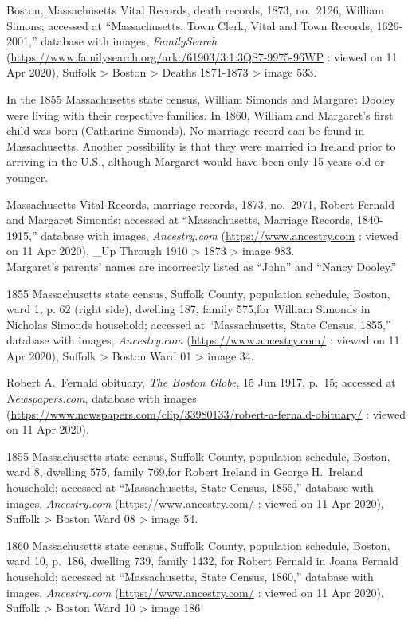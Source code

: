 \begin{thebibliography}{99}
	Boston, Massachusetts Vital Records, death records, 1873, no.\ 2126, William Simons; accessed at ``Massachusetts, Town Clerk, Vital and Town Records, 1626-2001,'' database with images, \textit{FamilySearch} (\url{https://www.familysearch.org/ark:/61903/3:1:3QS7-9975-96WP} : viewed on 11 Apr 2020), Suffolk > Boston > Deaths 1871-1873 > image 533.
	
	In the 1855 Massachusetts state census, William Simonds and Margaret Dooley were living with their respective families. In 1860, William and Margaret's first child was born (Catharine Simonds). No marriage record can be found in Massachusetts. Another possibility is that they were married in Ireland prior to arriving in the U.S., although Margaret would have been only 15 years old or younger.
	
	Massachusetts Vital Records, marriage records, 1873, no.\ 2971, Robert Fernald and Margaret Simonds; accessed at ``Massachusetts, Marriage Records, 1840-1915,'' database with images, \textit{Ancestry.com} (\url{https://www.ancestry.com} : viewed on 11 Apr 2020), \_Up Through 1910 > 1873 > image 983.\\
	Margaret's parents' names are incorrectly listed as ``John'' and ``Nancy Dooley.''
	
	1855 Massachusetts state census, Suffolk County, population schedule, Boston, ward 1, p. 62 (right side), dwelling 187, family 575,for William Simonds in Nicholas Simonds household; accessed at ``Massachusetts, State Census, 1855,'' database with images, \textit{Ancestry.com} (\url{https://www.ancestry.com/} : viewed on 11 Apr 2020), Suffolk > Boston Ward 01 > image 34.
	
	Robert A.\ Fernald obituary, \textit{The Boston Globe}, 15 Jun 1917, p.\ 15; accessed at \textit{Newspapers.com}, database with images (\url{https://www.newspapers.com/clip/33980133/robert-a-fernald-obituary/} : viewed on 11 Apr 2020).
	
	1855 Massachusetts state census, Suffolk County, population schedule, Boston, ward 8, dwelling 575, family 769,for Robert Ireland in George H.\ Ireland household; accessed at ``Massachusetts, State Census, 1855,'' database with images, \textit{Ancestry.com} (\url{https://www.ancestry.com/} : viewed on 11 Apr 2020), Suffolk > Boston Ward 08 > image 54.
	
	1860 Massachusetts state census, Suffolk County, population schedule, Boston, ward 10, p.\ 186, dwelling 739, family 1432, for Robert Fernald in Joana Fernald household; accessed at ``Massachusetts, State Census, 1860,'' database with images, \textit{Ancestry.com} (\url{https://www.ancestry.com/} : viewed on 11 Apr 2020), Suffolk > Boston Ward 10 > image 186
	

\end{thebibliography}

